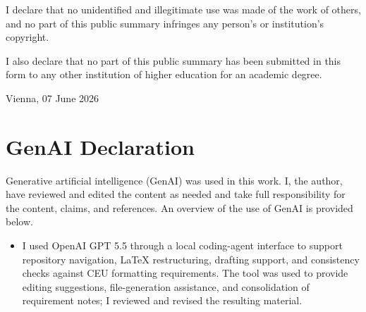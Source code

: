 \documentclass[12pt,a4paper]{article}
\begin{document}
\medskip
\noindent I declare that no unidentified and illegitimate use was made of the work of others, and no part of this public summary infringes any person's or institution's copyright.

\medskip
\noindent I also declare that no part of this public summary has been submitted in this form to any other institution of higher education for an academic degree.

\medskip
\noindent Vienna, 07 June 2026

\clearpage
\thispagestyle{plain}
\section*{GenAI Declaration}

\noindent Generative artificial intelligence (GenAI) was used in this work. I, the author, have reviewed and edited the content as needed and take full responsibility for the content, claims, and references. An overview of the use of GenAI is provided below.

\begin{itemize}
  \item I used OpenAI GPT 5.5 through a local coding-agent interface to support repository navigation, LaTeX restructuring, drafting support, and consistency checks against CEU formatting requirements. The tool was used to provide editing suggestions, file-generation assistance, and consolidation of requirement notes; I reviewed and revised the resulting material.
\end{itemize}

\clearpage
\begin{abstract}
This public summary describes a CEU MSc Business Analytics capstone project on Budapest rental price prediction for ingatlan.com. The project built an offline, reproducible analytics artifact to support a product question: whether ingatlan.com can provide a credible rent suggestion during listing upload so landlords price competitively and reduce time-on-market. The scope is Budapest rental flats, the target is monthly rent per square metre in HUF, and the primary metric is MdAPE, interpreted as a typical absolute percentage miss. The client-side success criterion is at most 10\% MdAPE in time-ordered cross-validation and holdout evaluation. The final artifact package includes warehouse and modelling notebooks, model reports, portable map and visual artifacts, documentation, and saved model artifacts. The best cross-validated model result reported in this public summary is 9.8\% MdAPE, below the client-side criterion, on a modelling sample of 50,898 rows. The same results also show a 17.6\% rent-per-square-metre shift in the reserved newest 20\% of listings, so the project recommendation is to treat the work as a strong offline benchmark and feature-readiness package rather than a production go-live approval. The proposed next steps are user-experience bands for suggestions, and a safe Budapest-only pilot.
\end{abstract}
\end{document}
